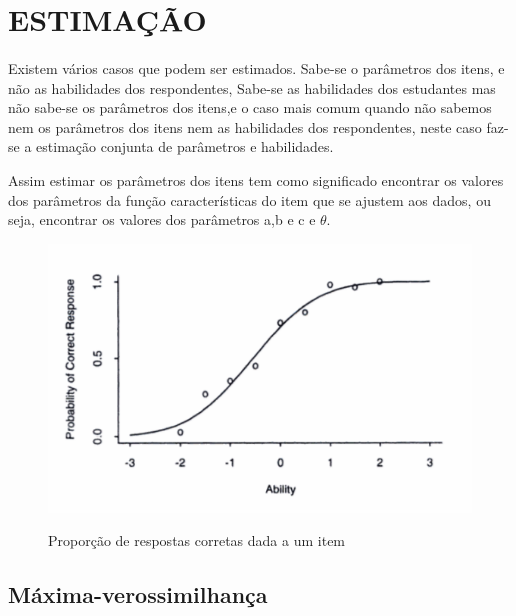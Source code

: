 \section{ESTIMAÇÃO}
	\paragraph{}
    	Existem vários casos que podem ser estimados. Sabe-se o parâmetros dos itens, e não as habilidades dos respondentes, 
    	Sabe-se as habilidades dos estudantes mas não sabe-se os parâmetros dos itens,e o caso mais comum quando não sabemos nem os parâmetros dos itens nem as habilidades dos respondentes, neste caso faz-se a estimação conjunta de parâmetros e habilidades.
	\par
	    Assim estimar os parâmetros dos itens tem como significado encontrar os valores dos parâmetros da função características do item que se ajustem aos dados, ou seja, encontrar os valores dos parâmetros a,b e c e $\theta$.
	\begin{figure}[!h]
	    \centering
	    \caption{Proporção de respostas corretas dada a um item}
	    \includegraphics[width=0.6\linewidth]{img/proporcao}
	    \label{fig:proporcao}
	\end{figure}
	
	\subsection{Máxima-verossimilhança}
